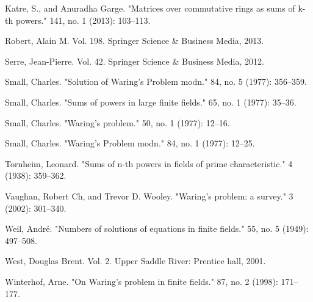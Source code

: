 \documentclass[11pt,reqno]{amsart}
\begin{document}
\begin{thebibliography}{10}
Katre, S., and Anuradha Garge.
\newblock "Matrices over commutative rings as sums of k-th powers."
 141, no. 1 (2013): 103--113.

Robert, Alain M.
 Vol. 198. 
\newblock Springer Science \& Business Media, 2013.

Serre, Jean-Pierre.
 Vol. 42.
\newblock Springer Science \& Business Media, 2012.

Small, Charles.
\newblock "Solution of Waring's Problem modn."
 84, no. 5 (1977): 356--359.

Small, Charles.
\newblock "Sums of powers in large finite fields."
 65, no. 1 (1977): 35--36.

Small, Charles.
\newblock "Waring's problem."
 50, no. 1 (1977): 12--16.

Small, Charles.
\newblock "Waring's Problem modn."
 84, no. 1 (1977): 12--25.

Tornheim, Leonard.
\newblock "Sums of n-th powers in fields of prime characteristic."
 4 (1938): 359--362.

Vaughan, Robert Ch, and Trevor D. Wooley.
\newblock "Waring's problem: a survey."
 3 (2002): 301--340.

Weil, Andr{\'e}.
\newblock "Numbers of solutions of equations in finite fields."
 55, no. 5 (1949): 497--508.

West, Douglas Brent.
 Vol. 2.
\newblock Upper Saddle River: Prentice hall, 2001.

Winterhof, Arne.
\newblock "On Waring's problem in finite fields."
 87, no. 2 (1998): 171--177.

\end{thebibliography}
\end{document}
